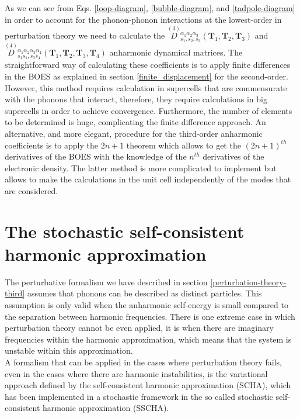 As we can see from Eqs. \ref{loop-diagram}, \ref{bubble-diagram}, and \ref{tadpole-diagram} in order to account for the phonon-phonon interactions at the lowest-order in perturbation theory we need to calculate 
the $\overset{(3)}{D}{}_{s_{1},s_{2},s_{3}}^{\alpha_{1}\alpha_{2}\alpha_{3}}(\mathbf{T}_{1},\mathbf{T}_{2},\mathbf{T}_{3})$ and $\overset{(4)}{D}{}_{s_{1}s_{1},s_{3}s_{4}}^{\alpha_{1}\alpha_{2}\alpha_{3}\alpha_{4}}(\mathbf{T}_{1},\mathbf{T}_{2},\mathbf{T}_{3},\mathbf{T}_{4})$ anharmonic dynamical matrices. The straightforward way of calculating these 
coefficients is to apply finite differences in the BOES\cite{li2014shengbte} as explained in section 
\ref{finite_displacement} for the second-order. However, this method requires calculation in supercells that are 
commensurate with the phonons that interact, therefore, they require calculations in big supercells in order to 
achieve convergence. Furthermore, the number of elements to be determined is huge, complicating the finite difference 
approach. An alternative, and more elegant, procedure for the third-order anharmonic coefficients is to apply the 
$2n+1$ theorem\cite{gonze1989density} which allows to get the $(2n+1)^{th}$ derivatives of the BOES with the 
knowledge of the $n^{th}$ derivatives of the electronic density. The latter method is more complicated to 
implement\cite{paulatto2013anharmonic} but allows to make the calculations in the unit cell independently of the 
modes that are considered.  

\section{The stochastic self-consistent harmonic approximation}
\label{sscha-basics}

The perturbative formalism we have described in section \ref{perturbation-theory-third} assumes that phonons can be described as distinct particles. This assumption is only valid when the anharmonic self-energy is 
small compared to the separation between harmonic frequencies. There is one extreme case in which perturbation theory cannot be even applied, it is when there are imaginary frequencies within the harmonic approximation, which 
means that the system is unstable within this approximation. \\

A formalism that can be applied in the cases where perturbation theory fails, even in the cases where there are harmonic instabilities, is the variational approach defined by the self-consistent harmonic 
approximation (SCHA)\cite{hooton1955li}, which has been implemented in a stochastic framework in the so called 
stochastic self-consistent harmonic approximation 
(SSCHA)\cite{errea2013first,errea2014anharmonic,bianco2017second,monacelli2018pressure}. \\ 

